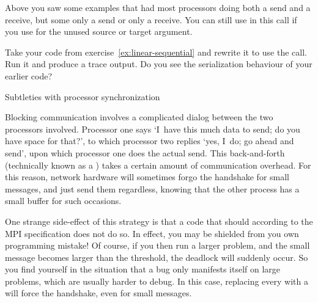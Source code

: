 Above you saw some examples that had most processors doing both a send and
a receive, but some only a send or only a receive. You can still use
 in this call if you use  for
the unused source or target argument.

\begin{exercise}
\label{ex:linear-sendrecv}
  Take your code from exercise~\ref{ex:linear-sequential}
  and rewrite it to use the  call. Run it and
  produce a trace output. Do you see the serialization behaviour
  of your earlier code?
\end{exercise}


 {Subtleties with processor synchronization}
\label{sec:handshake}

Blocking communication involves a complicated dialog between the two
processors involved. Processor one says `I~have this much data to
send; do you have space for that?', to which processor two replies
`yes, I~do; go ahead and send', upon which processor one does the
actual send. This back-and-forth (technically known as
a ) takes a certain amount of communication
overhead. For this reason, network hardware will sometimes forgo the
handshake for small messages, and just send them regardless, knowing
that the other process has a small buffer for such occasions.


One strange side-effect of this strategy is that a code that
should  according to the MPI specification does
not do so. In effect, you may be shielded from you own programming
mistake! Of course, if you then run a larger problem, and the small
message becomes larger than the threshold, the deadlock will suddenly
occur. So you find yourself in the situation that a bug only manifests
itself on large problems, which are usually harder to debug. In this
case, replacing every  with a  will force the
handshake, even for small messages.

